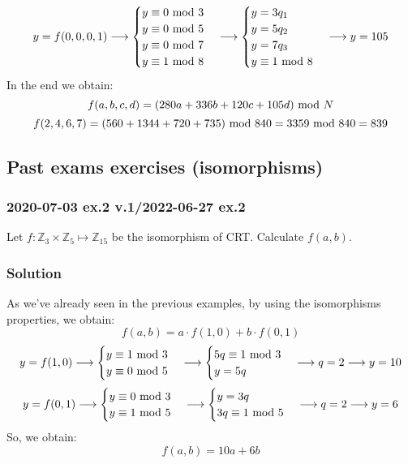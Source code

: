 \begin{equation*}
  y=f(0,0,0,1)\longrightarrow
  \begin{cases}
      y\equiv0\text{ mod }3\\
      y\equiv0\text{ mod }5\\
      y\equiv0\text{ mod }7\\
      y\equiv1\text{ mod }8
  \end{cases}\longrightarrow
  \begin{cases}
      y=3q_1\\
      y=5q_2\\
      y=7q_3\\
      y\equiv1\text{ mod }8
  \end{cases}\longrightarrow
  y=105
\end{equation*}
In the end we obtain:
$$f(a,b,c,d)=(280a+336b+120c+105d)\text{ mod } N$$
$$f(2,4,6,7)=(560+1344+720+735)\text{ mod }840=3359\text{ mod }840=839$$

\newpage
\subsection{Past exams exercises (isomorphisms)}
\subsubsection{2020-07-03 ex.2 v.1/2022-06-27 ex.2}
Let $f:\mathbb{Z}_3\times\mathbb{Z}_5\mapsto\mathbb{Z}_{15}$ be the isomorphism of CRT. Calculate $f(a,b)$.
\subsubsection*{Solution}
As we've already seen in the previous examples, by using the isomorphisms properties, we obtain:
$$f(a,b)=a\cdot f(1,0) + b\cdot f(0,1)$$
\begin{equation*}
    y=f(1,0)\longrightarrow
    \begin{cases}
        y\equiv1\text{ mod }3\\
        y\equiv0\text{ mod }5
    \end{cases}
    \longrightarrow
    \begin{cases}
        5q\equiv1\text{ mod }3\\
        y=5q
    \end{cases}
    \longrightarrow q=2\longrightarrow y=10
\end{equation*}
\begin{equation*}
    y=f(0,1)\longrightarrow
    \begin{cases}
        y\equiv0\text{ mod }3\\
        y\equiv1\text{ mod }5
    \end{cases}
    \longrightarrow
    \begin{cases}
        y=3q\\
        3q\equiv1\text{ mod }5
    \end{cases}
    \longrightarrow q=2\longrightarrow y=6
\end{equation*}
So, we obtain:
$$f(a,b)=10a+6b$$

